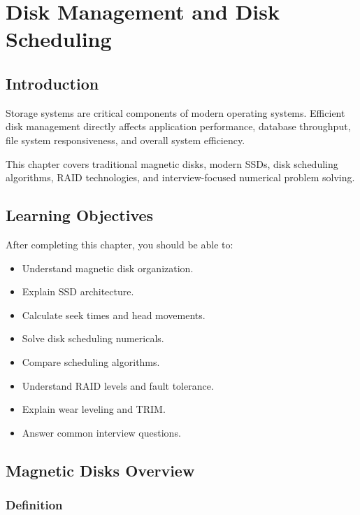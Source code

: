\chapter{Disk Management and Disk Scheduling}

\section{Introduction}

Storage systems are critical components of modern operating systems. Efficient disk management directly affects application performance, database throughput, file system responsiveness, and overall system efficiency.

This chapter covers traditional magnetic disks, modern SSDs, disk scheduling algorithms, RAID technologies, and interview-focused numerical problem solving.

\section{Learning Objectives}

After completing this chapter, you should be able to:

\begin{itemize}
\item Understand magnetic disk organization.
\item Explain SSD architecture.
\item Calculate seek times and head movements.
\item Solve disk scheduling numericals.
\item Compare scheduling algorithms.
\item Understand RAID levels and fault tolerance.
\item Explain wear leveling and TRIM.
\item Answer common interview questions.
\end{itemize}

\section{Magnetic Disks Overview}

\subsection{Definition}

